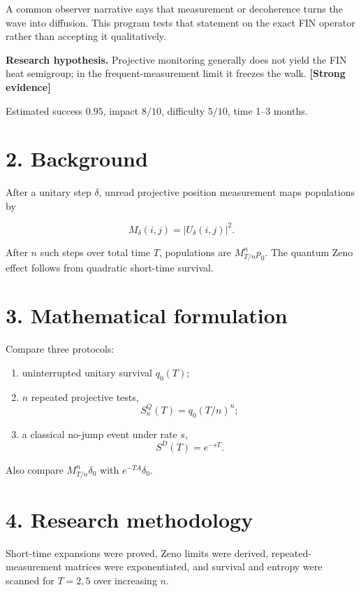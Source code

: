 \documentclass[11pt,a4paper,openany]{report}
\newcommand{\statusStrong}{\textcolor{finblue}{[Strong evidence]}}
\begin{document}
A common observer narrative says that measurement or decoherence turns the wave into diffusion. This program tests that statement on the exact FIN operator rather than accepting it qualitatively.

\textbf{Research hypothesis.} Projective monitoring generally does not yield the FIN heat semigroup; in the frequent-measurement limit it freezes the walk. \textbf{\statusStrong{}}

Estimated success \(0.95\), impact \(8/10\), difficulty \(5/10\), time 1–3 months.

\section{2. Background}

After a unitary step \(\delta\), unread projective position measurement maps populations by

\[
M_\delta(i,j)=|U_\delta(i,j)|^2.
\]

After \(n\) such steps over total time \(T\), populations are \(M_{T/n}^np_0\). The quantum Zeno effect follows from quadratic short-time survival.

\section{3. Mathematical formulation}

Compare three protocols:

\begin{enumerate}
\item 
uninterrupted unitary survival \(q_0(T)\);

\item 
\(n\) repeated projective tests, \[
   S_n^Q(T)=q_0(T/n)^n;
   \]

\item 
a classical no-jump event under rate \(s\), \[
   S^D(T)=e^{-sT}.
   \]

\end{enumerate}

Also compare \(M_{T/n}^n\delta_0\) with \(e^{-TA}\delta_0\).

\section{4. Research methodology}

Short-time expansions were proved, Zeno limits were derived, repeated-measurement matrices were exponentiated, and survival and entropy were scanned for \(T=2,5\) over increasing \(n\).
\end{document}
